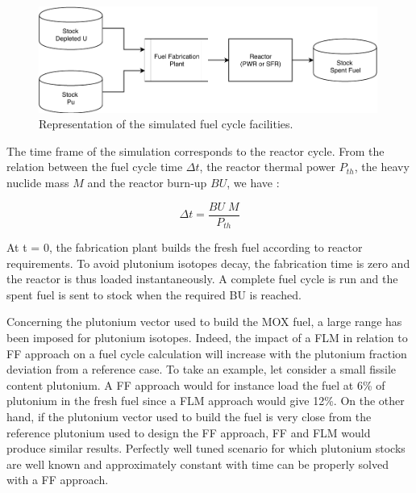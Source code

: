 \begin{figure}[h]
    \begin{center}
        \includegraphics[width = 0.99\textwidth]{FIG/FuelCycleDiagram.pdf}
        \caption{Representation of the simulated fuel cycle facilities.}
        \label{fig:FuelCycle}
    \end{center}
\end{figure}

The time frame of the simulation corresponds to the reactor cycle. From the
relation between the fuel cycle time $\Delta t$, the reactor thermal power
$P_{th}$, the heavy nuclide mass $M$ and the reactor burn-up $BU$, we have : 

\begin{equation}
    \Delta t = \frac{BU \; M}{P_{th}}
\end{equation}

At t = 0, the fabrication plant builds the fresh fuel according to reactor
requirements. To avoid plutonium isotopes decay, the fabrication time is zero
and the reactor is thus loaded instantaneously. A complete fuel cycle is run and
the spent fuel is sent to stock when the required BU is reached.

Concerning the plutonium vector used to build the \gls{MOX} fuel, a large range has
been imposed for plutonium isotopes. Indeed, the impact of a \gls{FLM} in
relation to \gls{FF} approach on a fuel cycle calculation will increase with the
plutonium fraction deviation from a reference case. To take an example, let
consider a small fissile content plutonium. A \gls{FF} approach would for
instance load the fuel at 6\% of plutonium in the fresh fuel since a \gls{FLM}
approach would give 12\%. On the other hand, if the plutonium vector used to
build the fuel is very close from the reference plutonium used to design the
\gls{FF} approach, \gls{FF} and \gls{FLM} would produce similar results.
Perfectly well tuned scenario for which plutonium stocks are well known and
approximately constant with time can be properly solved with a \gls{FF}
approach. 

